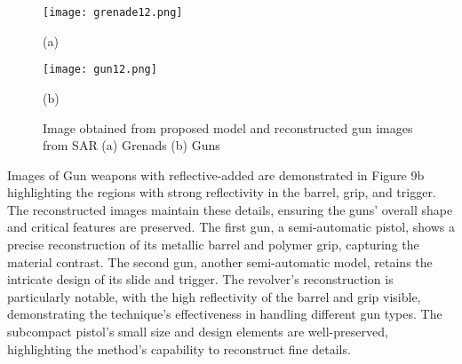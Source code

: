 \documentclass[journal,article,submit,pdftex,moreauthors]{Definitions/mdpi}
\begin{document}
\begin{figure}[h]
    \centering
    \begin{minipage}{0.49\textwidth}
        \centering
        \texttt{[image: grenade12.png]}
        \caption*{(a)}
    \end{minipage}
    \hfill
    \begin{minipage}{0.49\textwidth}
        \centering
        \texttt{[image: gun12.png]}
        \caption*{(b)}
    \end{minipage}
    \caption{Image obtained from proposed model and reconstructed gun images from SAR (a) Grenads    (b) Guns}
    \label{fig:side_by_side}
\end{figure}














Images of Gun weapons with reflective-added are demonstrated in Figure 9b highlighting the regions with strong reflectivity in the barrel, grip, and trigger. The reconstructed images maintain these details, ensuring the guns' overall shape and critical features are preserved. The first gun, a semi-automatic pistol, shows a precise reconstruction of its metallic barrel and polymer grip, capturing the material contrast. The second gun, another semi-automatic model, retains the intricate design of its slide and trigger. The revolver's reconstruction is particularly notable, with the high reflectivity of the barrel and grip visible, demonstrating the technique's effectiveness in handling different gun types. The subcompact pistol’s small size and design elements are well-preserved, highlighting the method's capability to reconstruct fine details.
\end{document}
